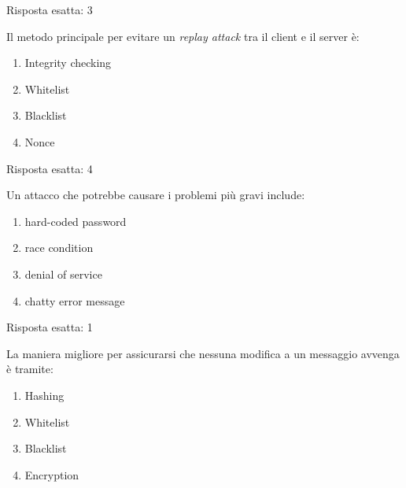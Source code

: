 \begin{Answer} [
  ref={esControlli7},
  number={7}
  ]

  \Question Risposta esatta: 3
\end{Answer}


\begin{Exercise} [
  title={Quiz},
  label={esControlli8}
  ]

  \Question Il metodo principale per evitare un \textit{replay attack} tra il 
client e il server è:
\begin{enumerate}
\item Integrity checking
\item Whitelist
\item Blacklist
\item Nonce
\end{enumerate}

\end{Exercise}

\begin{Answer} [
  ref={esControlli8},
  number={8}
  ]

  \Question Risposta esatta: 4
\end{Answer}


\begin{Exercise} [
  title={Quiz},
  label={esControlli9}
  ]

  \Question Un attacco che potrebbe causare i problemi più gravi include:
  \begin{enumerate}
    \item hard-coded password
    \item race condition
    \item denial of service
    \item chatty error message
  \end{enumerate}

\end{Exercise}

\begin{Answer} [
  ref={esControlli9},
  number={9}
  ]

  \Question Risposta esatta: 1
\end{Answer}


\begin{Exercise} [
  title={Quiz},
  label={esControlli10}
  ]

  \Question La maniera migliore per assicurarsi che nessuna modifica a un 
messaggio avvenga è tramite:
\begin{enumerate}
  \item Hashing
  \item Whitelist
  \item Blacklist
  \item Encryption
\end{enumerate}

\end{Exercise}

